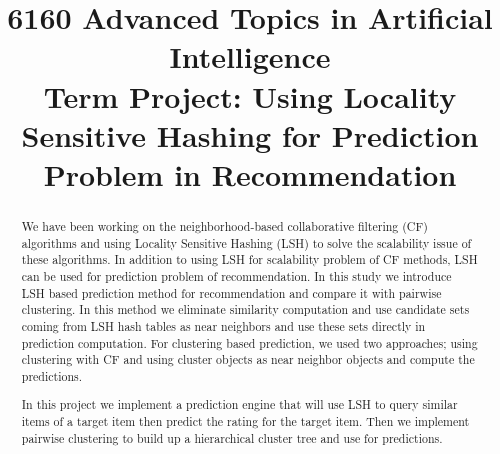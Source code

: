 \documentclass[conference]{IEEEtran}
\begin{document}
%
\title {6160 Advanced Topics in Artificial Intelligence \\Term Project: Using Locality Sensitive Hashing for Prediction Problem in Recommendation}

\author{
 }



% 




\maketitle


\begin{abstract}

We have been working on the neighborhood-based collaborative filtering (CF) 
algorithms and using Locality Sensitive Hashing (LSH) to solve the scalability 
issue of these algorithms. In addition to using LSH for scalability problem of 
CF methods, LSH can be used for prediction problem of recommendation. 
In this study we introduce LSH based prediction method for recommendation and 
compare it with pairwise clustering. In this method we eliminate similarity 
computation and use candidate sets coming from LSH hash tables as near 
neighbors and use these sets directly in prediction computation. For clustering
based prediction, we used two approaches; using clustering with CF and using 
cluster objects as near neighbor objects and compute the predictions.

In this project we implement a prediction engine that will use LSH to 
query similar items of a target item then predict the rating for the target 
item. Then we implement pairwise clustering to build up a hierarchical cluster 
tree and use for predictions.

\end{abstract}
\end{document}
